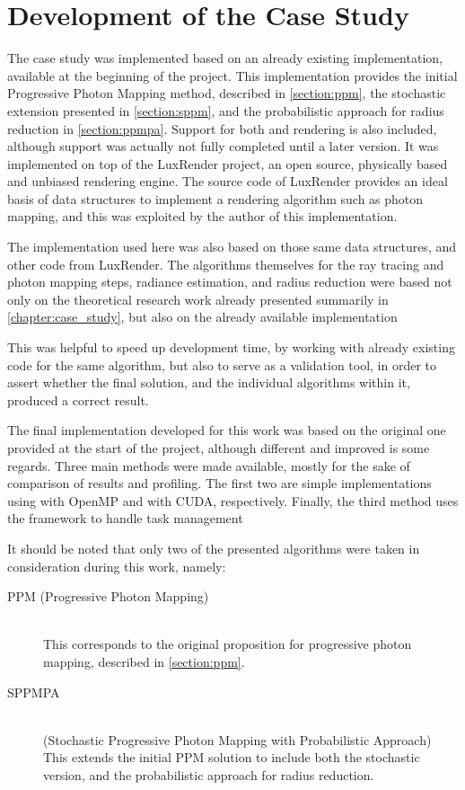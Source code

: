 \documentclass[main.tex]{subfiles}
\begin{document}
\chapter{Development of the Case Study} \label{chapter:impl}

The case study was implemented based on an already existing implementation, available at the beginning of the project. This implementation provides the initial Progressive Photon Mapping method, described in \cref{section:ppm}, the stochastic extension presented in \cref{section:sppm}, and the probabilistic approach for radius reduction in \cref{section:ppmpa}. Support for both \cpu and \cuda rendering is also included, although \cuda support was actually not fully completed until a later version. It was implemented on top of the LuxRender project, an open source, physically based and unbiased rendering engine. The source code of LuxRender provides an ideal basis of data structures to implement a rendering algorithm such as photon mapping, and this was exploited by the author of this implementation.

The implementation used here was also based on those same data structures, and other code from LuxRender. The algorithms themselves for the ray tracing and photon mapping steps, radiance estimation, and radius reduction were based not only on the theoretical research work already presented summarily in \cref{chapter:case_study}, but also on the already available implementation

This was helpful to speed up development time, by working with already existing code for the same algorithm, but also to serve as a validation tool, in order to assert whether the final solution, and the individual algorithms within it, produced a correct result.

The final implementation developed for this work was based on the original one provided at the start of the project, although different and improved is some regards. Three main methods were made available, mostly for the sake of comparison of results and profiling. The first two are simple implementations using \cpus with \acs{OpenMP} and \gpus with \acs{CUDA}, respectively. Finally, the third method uses the \starpu framework to handle task management

It should be noted that only two of the presented algorithms were taken in consideration during this work, namely:

\begin{description}
\item[PPM (Progressive Photon Mapping)] \hfill \\
  This corresponds to the original proposition for progressive photon mapping, described in \cref{section:ppm}.

\item[SPPMPA] \hfill \\
  (Stochastic Progressive Photon Mapping with Probabilistic Approach) This extends the initial PPM solution to include both the stochastic version, and the probabilistic approach for radius reduction.
\end{description}
\end{document}
